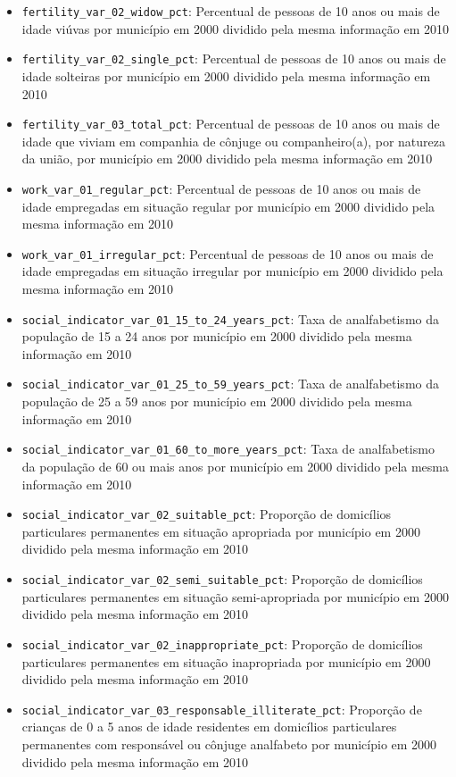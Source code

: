 \begin{itemize}
	\item \verb|fertility_var_02_widow_pct|: Percentual de pessoas de 10 anos ou mais de idade viúvas por município em 2000 dividido pela mesma informação em 2010
	\item \verb|fertility_var_02_single_pct|: Percentual de pessoas de 10 anos ou mais de idade solteiras por município em 2000 dividido pela mesma informação em 2010
	\item \verb|fertility_var_03_total_pct|: Percentual de pessoas de 10 anos ou mais de idade que viviam em companhia de cônjuge ou companheiro(a), por natureza da união, por município em 2000 dividido pela mesma informação em 2010
	\item \verb|work_var_01_regular_pct|: Percentual de pessoas de 10 anos ou mais de idade empregadas em situação regular por município em 2000 dividido pela mesma informação em 2010
	\item \verb|work_var_01_irregular_pct|: Percentual de pessoas de 10 anos ou mais de idade empregadas em situação irregular por município em 2000 dividido pela mesma informação em 2010
	\item \verb|social_indicator_var_01_15_to_24_years_pct|: Taxa de analfabetismo da população de 15 a 24 anos por município em 2000 dividido pela mesma informação em 2010
	\item \verb|social_indicator_var_01_25_to_59_years_pct|: Taxa de analfabetismo da população de 25 a 59 anos por município em 2000 dividido pela mesma informação em 2010
	\item \verb|social_indicator_var_01_60_to_more_years_pct|: Taxa de analfabetismo da população de 60 ou mais anos por município em 2000 dividido pela mesma informação em 2010
	\item \verb|social_indicator_var_02_suitable_pct|: Proporção de domicílios particulares permanentes em situação apropriada por município em 2000 dividido pela mesma informação em 2010
	\item \verb|social_indicator_var_02_semi_suitable_pct|: Proporção de domicílios particulares permanentes em situação semi-apropriada por município em 2000 dividido pela mesma informação em 2010
	\item \verb|social_indicator_var_02_inappropriate_pct|: Proporção de domicílios particulares permanentes em situação inapropriada por município em 2000 dividido pela mesma informação em 2010
	\item \verb|social_indicator_var_03_responsable_illiterate_pct|: Proporção de crianças de 0 a 5 anos de idade residentes em domicílios particulares permanentes com responsável ou cônjuge analfabeto por município em 2000 dividido pela mesma informação em 2010

\end{itemize}
